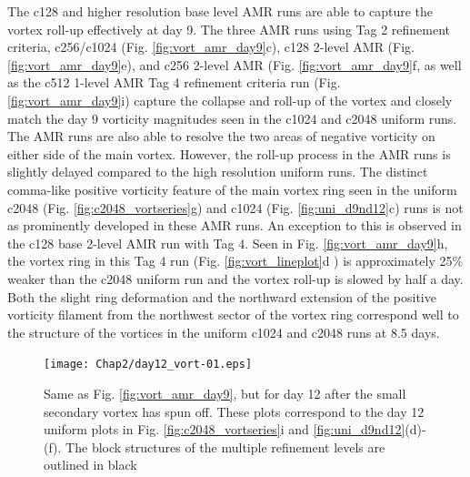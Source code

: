 The c128 and higher resolution base level AMR runs are able to capture the vortex roll-up
effectively at day 9. The three AMR runs using Tag 2 refinement criteria, 
c256/c1024 (Fig. \ref{fig:vort_amr_day9}c), c128 2-level AMR
(Fig. \ref{fig:vort_amr_day9}e), and c256 2-level AMR (Fig. \ref{fig:vort_amr_day9}f,
as well as the c512 1-level AMR Tag 4 refinement criteria run (Fig. \ref{fig:vort_amr_day9}i)
capture the collapse and roll-up of the vortex and closely match the day 9 vorticity magnitudes
seen in the c1024 and c2048 uniform runs.
The AMR runs are also able to resolve  the two areas of negative vorticity 
on either side of the main vortex. However, the roll-up process in the AMR runs is slightly
delayed compared to the high resolution uniform runs. The distinct comma-like positive vorticity 
feature of the main vortex ring seen in the uniform c2048 (Fig. \ref{fig:c2048_vortseries}g) and c1024 (Fig. \ref{fig:uni_d9nd12}c) runs
is not as prominently developed in these AMR runs. 
An exception to this is observed in the c128 base 2-level AMR run with Tag 4. Seen in
Fig. \ref{fig:vort_amr_day9}h, the vortex ring in this Tag 4 run (Fig. \ref{fig:vort_lineplot}d )
is approximately 25\% weaker than the c2048 uniform run and the vortex
roll-up is slowed by half a day. Both the slight ring deformation and the northward extension of the positive vorticity filament 
from the northwest sector of the vortex ring correspond well to the structure of
the vortices in the uniform c1024 and c2048 runs at 8.5 days. 

\begin{figure}
   \centerline{%
   \noindent
   \texttt{[image: Chap2/day12\_vort-01.eps]}}
   \caption{Same as Fig. \ref{fig:vort_amr_day9}, but for day 12 after the small
   secondary vortex has spun off. These plots correspond to the day 12 uniform
   plots in Fig. \ref{fig:c2048_vortseries}i and \ref{fig:uni_d9nd12}(d)-(f). 
   The block structures of the multiple refinement
   levels are outlined in black
   }
   \label{fig:vort_amr_day12}
\end{figure}

